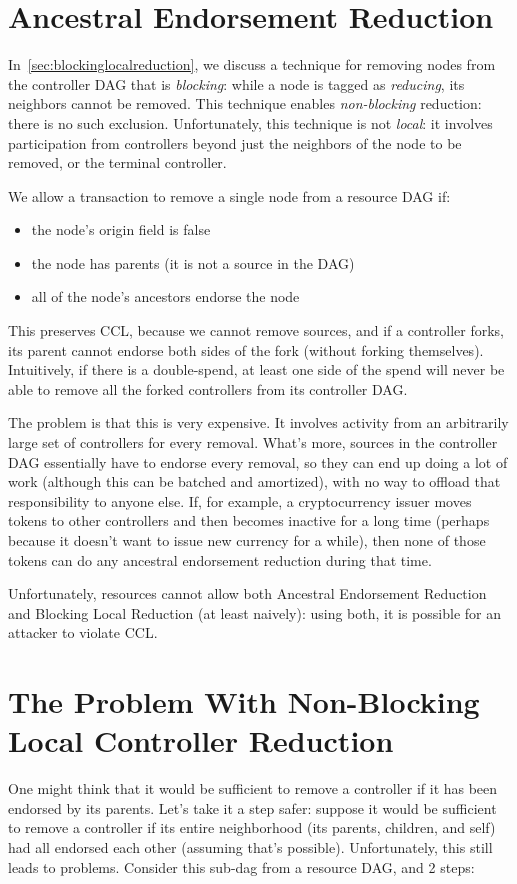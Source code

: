 \documentclass[a4paper,USenglish,cleveref, autoref, thm-restate, anonymous]{lipics-v2021}
\begin{document}
\section{Ancestral Endorsement Reduction}
\label{sec:ancestral}
In~\cref{sec:blockinglocalreduction}, we discuss a technique for removing nodes from the controller DAG that is \emph{blocking}: while a node is tagged as \emph{reducing}, its neighbors cannot be removed.
This technique enables \emph{non-blocking} reduction: there is no such exclusion.
Unfortunately, this technique is not \emph{local}: it involves participation from controllers beyond just the neighbors of the node to be removed, or the terminal controller.

We allow a transaction to remove a single node from a resource DAG if:
\begin{itemize}
    \item the node's origin field is false
    \item the node has parents (it is not a source in the DAG)
    \item all of the node's ancestors endorse the node
\end{itemize}
This preserves CCL, because we cannot remove sources, and if a controller forks, its parent cannot endorse both sides of the fork (without forking themselves). 
Intuitively, if there is a double-spend, at least one side of the spend will never be able to remove all the forked controllers from its controller DAG. 

The problem is that this is very expensive. 
It involves activity from an arbitrarily large set of controllers for every removal. 
What's more, sources in the controller DAG essentially have to endorse every removal, so they can end up doing a lot of work (although this can be batched and amortized), with no way to offload that responsibility to anyone else. 
If, for example, a cryptocurrency issuer moves tokens to other controllers and then becomes inactive for a long time (perhaps because it doesn't want to issue new currency for a while), then none of those tokens can do any ancestral endorsement reduction during that time.

Unfortunately, resources cannot allow both Ancestral Endorsement Reduction and Blocking Local Reduction (at least naively): using both, it is possible for an attacker to violate CCL.

\section{The Problem With Non-Blocking Local Controller Reduction}
\label{sec:nonblockingproblem}
One might think that it would be sufficient to remove a controller if it has been endorsed by its parents.
Let's take it a step safer:
suppose it would be sufficient to remove a controller if its entire neighborhood (its parents, children, and self) had all endorsed each other (assuming that's possible). 
Unfortunately, this still leads to problems. 
Consider this sub-dag from a resource DAG, and 2  steps:
\end{document}
